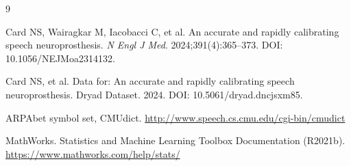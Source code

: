 \documentclass[11pt,a4paper]{ctexart}
\begin{document}
\begin{thebibliography}{9}

 Card NS, Wairagkar M, Iacobacci C, et al. An accurate and rapidly calibrating speech neuroprosthesis. \textit{N Engl J Med}. 2024;391(4):365--373. DOI: 10.1056/NEJMoa2314132.

 Card NS, et al. Data for: An accurate and rapidly calibrating speech neuroprosthesis. Dryad Dataset. 2024. DOI: 10.5061/dryad.dncjsxm85.

 ARPAbet symbol set, CMUdict. \url{http://www.speech.cs.cmu.edu/cgi-bin/cmudict}

 MathWorks. Statistics and Machine Learning Toolbox Documentation (R2021b). \url{https://www.mathworks.com/help/stats/}

\end{thebibliography}
\end{document}
